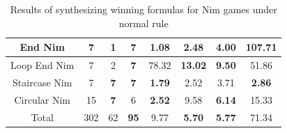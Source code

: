 \begin{table}[h!]
\begin{tabular}{|c|c|c|c|c|c|c|c|}
		End Nim & 7 & 1 & \textbf{7} & \textbf{1.08} & 2.48 & \textbf{4.00} & 107.71 \\ \hline
		Loop End Nim & 7 & 2 & \textbf{7} & 78.32 & \textbf{13.02} & \textbf{9.50} & 51.86 \\ \hline
		Staircase Nim & 7 & \textbf{7} & \textbf{7} & \textbf{1.79} & 2.52 & 3.71 & \textbf{2.86} \\ \hline
		Circular Nim & 15 & \textbf{7} & 6 & \textbf{2.52} & 9.58 & \textbf{6.14} & 15.33 \\ \hline
		Total & 302 & 62 & \textbf{95} & 9.77 & \textbf{5.70} & \textbf{5.77} & 71.34 \\ \hline
	\end{tabular}
	\caption{Results of synthesizing winning formulas for Nim games under normal rule}
	\label{tab:normal-nim-winFormulas}
\end{table}

